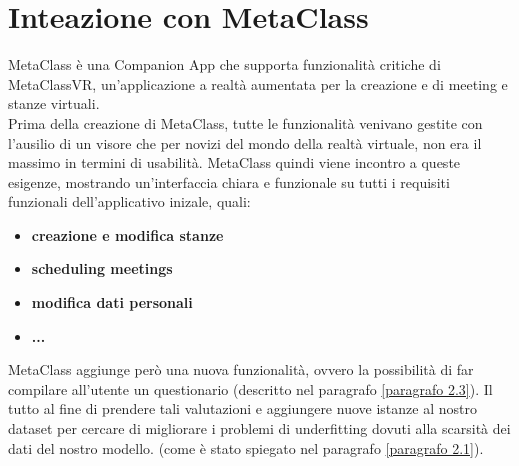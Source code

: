 \section{ Inteazione con MetaClass }
\fancyhead[]{}
MetaClass è una Companion App che supporta funzionalità critiche di MetaClassVR, un'applicazione a realtà aumentata per la creazione e di meeting e stanze virtuali. \\
Prima della creazione di MetaClass, tutte le funzionalità venivano gestite con l'ausilio di un visore che per novizi del mondo della realtà virtuale, non era il massimo in termini di usabilità.
MetaClass quindi viene incontro a queste esigenze, mostrando un'interfaccia chiara e funzionale su tutti i requisiti funzionali dell'applicativo inizale, quali:
\par{
\begin{itemize}
    \item \textbf{creazione e modifica stanze}
    \item \textbf{scheduling meetings}
    \item \textbf{modifica dati personali}
    \item \textbf{...}
\end{itemize}
}
MetaClass aggiunge però una nuova funzionalità, ovvero la possibilità di far compilare all'utente un questionario (descritto nel paragrafo \ref{paragrafo 2.3}). 
Il tutto al fine di prendere tali valutazioni e aggiungere nuove istanze al nostro dataset per cercare di migliorare i problemi di underfitting dovuti alla scarsità dei dati del nostro modello. (come è stato spiegato nel paragrafo \ref{paragrafo 2.1}). \\

\newpage

\newpage

\newpage

